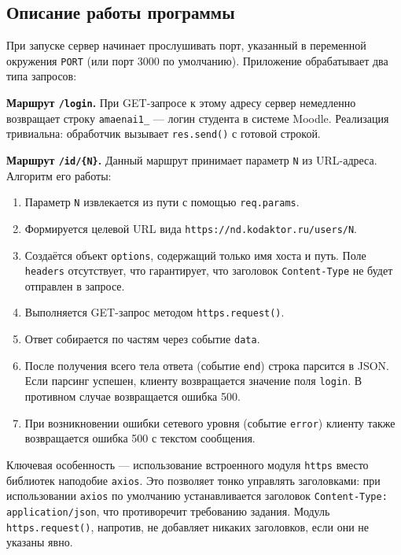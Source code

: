 \documentclass[a4paper,12pt]{article}
\begin{document}
\subsection{Описание работы программы}

При запуске сервер начинает прослушивать порт, указанный в
переменной окружения \texttt{PORT} (или порт 3000 по умолчанию).
Приложение обрабатывает два типа запросов:

\textbf{Маршрут \texttt{/login}.} При GET-запросе к этому адресу
сервер немедленно возвращает строку \texttt{amaenai1\_} --- логин
студента в системе Moodle. Реализация тривиальна: обработчик
вызывает \texttt{res.send()} с готовой строкой.

\textbf{Маршрут \texttt{/id/\{N\}}.} Данный маршрут принимает
параметр \texttt{N} из URL-адреса. Алгоритм его работы:

\begin{enumerate}
  \item Параметр \texttt{N} извлекается из пути с помощью
        \texttt{req.params}.
  \item Формируется целевой URL вида
        \texttt{https://nd.kodaktor.ru/users/N}.
  \item Создаётся объект \texttt{options}, содержащий только
        имя хоста и путь. Поле \texttt{headers} отсутствует, что
        гарантирует, что заголовок \texttt{Content-Type} не будет
        отправлен в запросе.
  \item Выполняется GET-запрос методом \texttt{https.request()}.
  \item Ответ собирается по частям через событие \texttt{data}.
  \item После получения всего тела ответа (событие \texttt{end})
        строка парсится в JSON. Если парсинг успешен, клиенту
        возвращается значение поля \texttt{login}. В противном
        случае возвращается ошибка 500.
  \item При возникновении ошибки сетевого уровня (событие
        \texttt{error}) клиенту также возвращается ошибка 500 с
        текстом сообщения.
\end{enumerate}

Ключевая особенность --- использование встроенного модуля
\texttt{https} вместо библиотек наподобие \texttt{axios}. Это
позволяет тонко управлять заголовками: при использовании
\texttt{axios} по умолчанию устанавливается заголовок
\texttt{Content-Type: application/json}, что противоречит
требованию задания. Модуль \texttt{https.request()}, напротив,
не добавляет никаких заголовков, если они не указаны явно.
\end{document}
